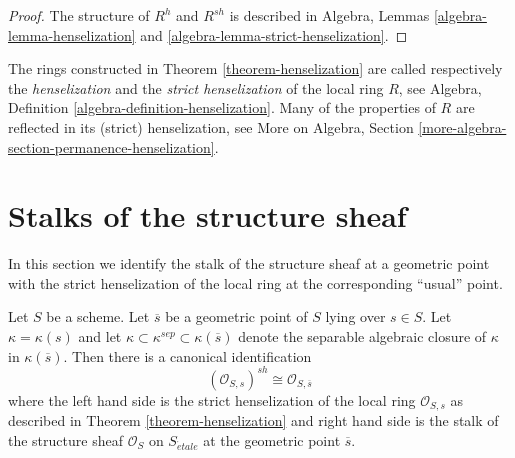 \begin{proof}
The structure of $R^h$ and $R^{sh}$ is described in
Algebra, Lemmas \ref{algebra-lemma-henselization} and
\ref{algebra-lemma-strict-henselization}.
\end{proof}

\noindent
The rings constructed in Theorem \ref{theorem-henselization}
are called respectively the {\it henselization} and the
{\it strict henselization} of the local ring $R$, see
Algebra, Definition \ref{algebra-definition-henselization}.
Many of the properties of $R$ are reflected in its (strict) henselization,
see More on Algebra,
Section \ref{more-algebra-section-permanence-henselization}.




\section{Stalks of the structure sheaf}
\label{section-stalks-structure-sheaf}

\noindent
In this section we identify the stalk of the structure sheaf at a geometric
point with the strict henselization of the local ring at the corresponding
``usual'' point.

\begin{lemma}
\label{lemma-describe-etale-local-ring}
Let $S$ be a scheme.
Let $\overline{s}$ be a geometric point of $S$ lying over $s \in S$.
Let $\kappa = \kappa(s)$ and let
$\kappa \subset \kappa^{sep} \subset \kappa(\overline{s})$ denote
the separable algebraic closure of $\kappa$ in $\kappa(\overline{s})$.
Then there is a canonical identification
$$
(\mathcal{O}_{S, s})^{sh}
\cong
\mathcal{O}_{S, \overline{s}}
$$
where the left hand side is the strict henselization of the local ring
$\mathcal{O}_{S, s}$ as described in
Theorem \ref{theorem-henselization}
and right hand side is the stalk of the structure sheaf
$\mathcal{O}_S$ on $S_{\acute{e}tale}$ at
the geometric point $\overline{s}$.
\end{lemma}

